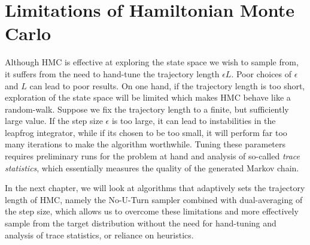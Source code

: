 \section{Limitations of Hamiltonian Monte Carlo}
Although HMC is effective at exploring the state space we wish to sample from, it suffers from the need to hand-tune
the trajectory length $\epsilon L$. Poor choices of $\epsilon$ and $L$ can lead to poor results.
On one hand, if the trajectory length is too short, exploration of the state space will be limited 
which makes HMC behave like a random-walk. Suppose we fix the trajectory length to a finite,
but sufficiently large value.
If the step size $\epsilon$ is too large,
it can lead to instabilities in the leapfrog integrator, while if its chosen to be too small, it will perform far too many
iterations to make the algorithm worthwhile. 
Tuning these parameters requires preliminary runs for the problem at hand and analysis of so-called \textit{trace statistics}, 
which essentially measures the quality of the generated Markov chain. 

In the next chapter, we will look at algorithms that adaptively sets the trajectory length of HMC,
namely the No-U-Turn sampler combined with dual-averaging of the step size, which allows us to overcome these
limitations and more effectively sample from the target distribution without the need for hand-tuning
and analysis of trace statistics, or reliance on heuristics.

